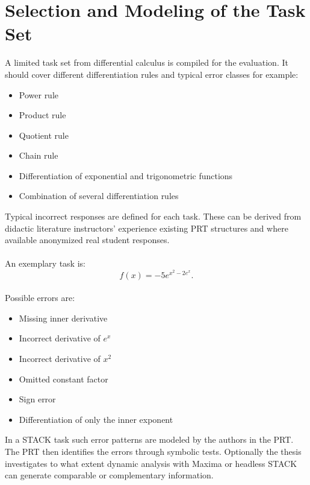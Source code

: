 \documentclass[11pt,a4paper,oneside,ngerman]{memoir}
\begin{document}
\section{Selection and Modeling of the Task Set}
A limited task set from differential calculus is compiled for the evaluation. It should cover different differentiation rules and typical error classes for example:
\begin{itemize}
    \item Power rule
    \item Product rule
    \item Quotient rule
    \item Chain rule
    \item Differentiation of exponential and trigonometric functions
    \item Combination of several differentiation rules
\end{itemize}
Typical incorrect responses are defined for each task. These can be derived from didactic literature instructors' experience existing PRT structures and where available anonymized real student responses.
\hspace{1 cm}\\\\
An exemplary task is:
\[
f(x)=-5e^{x^2-2e^x}.
\]
\hspace{1 cm}\\
Possible errors are:
\begin{itemize}
    \item Missing inner derivative
    \item Incorrect derivative of \(e^x\)
    \item Incorrect derivative of \(x^2\)
    \item Omitted constant factor
    \item Sign error
    \item Differentiation of only the inner exponent
\end{itemize}
In a STACK task such error patterns are modeled by the authors in the PRT. The PRT then identifies the errors through symbolic tests. Optionally the thesis investigates to what extent dynamic analysis with Maxima or headless STACK can generate comparable or complementary information.
\end{document}

